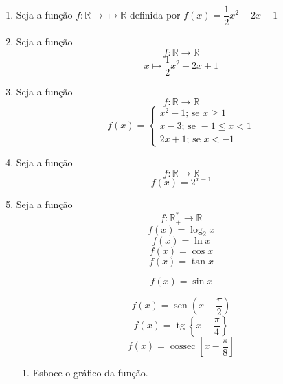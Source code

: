 \documentclass[a4paper,12pt]{article}
\DeclareMathOperator{\sen}{sen}
\DeclareMathOperator{\cossec}{cossec}
\DeclareMathOperator{\tg}{tg}
\begin{document}
\begin{enumerate}
\begin{comment}
Comentário, muito útil para 
\end{comment}
\item Seja a função $f: \mathbb{R} \to \mapsto \mathbb{R}$ definida por $f(x)= \dfrac{1}{2}x^2 - 2x + 1$

\item Seja a função $$f: \mathbb{R} \to \mathbb{R}$$
 $$x \mapsto \dfrac{1}{2}x^2 - 2x + 1$$
\item Seja a função $$f: \mathbb{R} \to \mathbb{R}$$
$$f(x)=
\begin{cases}
	x^2 - 1; \, \textrm{se } x \geq 1 \\
	x - 3; \, \textrm{se } -1 \leq x<1 \\
	2x+1; \, \textrm{se } x < -1
\end{cases}
$$
\item Seja a função $$f: \mathbb{R} \to \mathbb{R}$$
$$f(x)=2^{x-1}$$
\item Seja a função $$f: \mathbb{R}^*_+ \to \mathbb{R}$$
$$f(x)= \log_2 x$$
$$f(x)= \ln x$$
$$f(x)= \cos x$$
$$f(x)= \tan x$$
\begin{comment}
Exemplo da notação original de seno
\end{comment}
$$f(x)= \sin x$$
\begin{comment}
Exemplo da notação de seno com o jeitinho brasileiro
\end{comment}
$$f(x)= \sen \left(x - \frac{\pi}{2} \right)$$
$$f(x)= \tg \left\{x - \frac{\pi}{4} \right\}$$
$$f(x)= \cossec \left[x - \frac{\pi}{8} \right]$$
	\begin{enumerate}
		\item Esboce o gráfico da função.
	\end{enumerate}
\end{enumerate}
\end{document}
